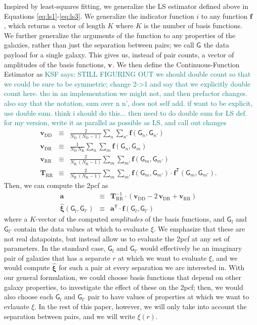 \documentclass[modern]{aastex62}
\newcommand{\cf}{2pcf\xspace} %
\newcommand{\est}{the Continuous-Function Estimator\xspace}
\newcommand{\LS}{LS\xspace}
\newcommand{\inv}{^{-1}}
\newcommand{\T}{^{\mathsf{T}}}
\newcommand{\bld}[1]{\bm{#1}} %
\newcommand{\vv}[1]{\bld{v}_\mathrm{#1}}
\newcommand{\TT}[1]{\bld{T}_\mathrm{#1}}
\newcommand{\ff}{\bld{f}}
\newcommand{\NN}[1]{N_\mathrm{#1}}
\newcommand{\GG}[1]{\mathsf{G}_{#1}}
\newcommand{\KSF}[1]{\textcolor{teal}{KSF says: #1}}
\begin{document}
Inspired by least-squares fitting, we generalize the \LS estimator defined above in Equations \ref{eq:ls1}-\ref{eq:ls3}.
We generalize the indicator function $i$ to any function $\ff$, which returns a vector of length $K$ where $K$ is the number of basis functions.
We further generalize the arguments of the function to any properties of the galaxies, rather than just the separation between pairs; we call $\GG{}$ the data payload for a single galaxy.
This gives us, instead of pair counts, a vector of amplitudes of the basis functions, $\vv{}$.
We then define \est as
\KSF{STILL FIGURING OUT we should double count so that we could be sure to be symmetric; change 2->1 and say that we explicitly double count here. tho in an implementation we might not, and then prefactor changes. also say that the notation, sum over n n', does not self add. if want to be explicit, use double sum. think i should do this... then need to do double sum for LS def. for my version, write it as parallel as possible as LS, and call out changes}
\begin{eqnarray}\displaystyle
\vv{DD} &\equiv& \frac{2}{\NN{D}\,(\NN{D}-1)} \sum_{n} \sum_{n'} \ff(\GG{n}, \GG{n'}) \\
\vv{DR} &\equiv& \frac{1}{\NN{D}\,\NN{R}} \sum_{n} \sum_{m} \ff(\GG{n}, \GG{m}) \\
\vv{RR} &\equiv& \frac{2}{\NN{R}\,(\NN{R}-1)} \sum_{m} \sum_{m'} \ff(\GG{m}, \GG{m'}) \\
\TT{RR} &\equiv& \frac{2}{\NN{R}\,(\NN{R}-1)} \sum_{m} \sum_{m'} \ff(\GG{m}, \GG{m'}) \cdot \ff\T(\GG{m}, \GG{m'}). \label{eq:qq_proj}
\end{eqnarray}
Then, we can compute the \cf as
\begin{eqnarray}\displaystyle
\bld{a} &\equiv& \TT{RR}\inv \cdot (\vv{DD} - 2\,\vv{DR} + \vv{RR}) \\
\bld{\hat{\xi}}(\GG{l}, \GG{l'})  &\equiv& \bld{a}\T \cdot \ff(\GG{l}, \GG{l'}) \label{eq:xi_proj}
\end{eqnarray}
where a $K$-vector of the computed \emph{amplitudes} of the basis functions, and $\GG{l}$ and $\GG{l'}$ contain the data values at which to evaluate $\xi$.
We emphasize that these are not real datapoints, but instead allow us to evaluate the \cf at any set of parameters.
In the standard case, $\GG{l}$ and $\GG{l'}$ would effectively be an imaginary pair of galaxies that has a separate $r$ at which we want to evaluate $\xi$, and we would compute $\bld{\hat{\xi}}$ for such a pair at every separation we are interested in.
With our general formulation, we could choose basis functions that depend on other galaxy properties, to investigate the effect of these on the \cf; then, we would also choose each $\GG{l}$ and $\GG{l'}$ pair to have values of properties at which we want to evlauate $\xi$. 
In the rest of this paper, however, we will only take into account the separation between pairs, and we will write $\xi(r)$.
\end{document}
